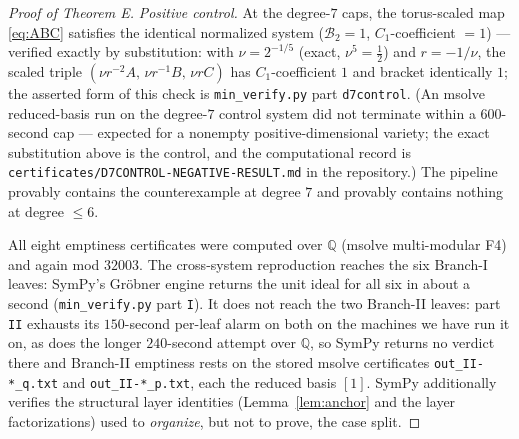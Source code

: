 \documentclass[11pt]{amsart}
\newcommand{\QQ}{\mathbb{Q}}
\newcommand{\brk}{\mathcal{B}}
\theoremstyle{plain}
\theoremstyle{definition}
\theoremstyle{remark}
\begin{document}
\begin{proof}[Proof of Theorem E]
\emph{Positive control.} At the degree-$7$ caps, the torus-scaled map
\eqref{eq:ABC} satisfies the identical normalized system ($\brk_{2}=1$,
$C_{1}$-coefficient $=1$) --- verified exactly by substitution: with
$\nu=2^{-1/5}$ (exact, $\nu^{5}=\tfrac12$) and $r=-1/\nu$, the scaled
triple $(\nu r^{-2}A,\,\nu r^{-1}B,\,\nu rC)$ has $C_{1}$-coefficient
$1$ and bracket identically $1$; the asserted form of this check is
\texttt{min\_verify.py} part \texttt{d7control}. (An msolve reduced-basis
run on the degree-$7$ control system did not terminate within a
$600$-second cap --- expected for a nonempty positive-dimensional
variety; the exact substitution above is the control, and the
computational record is
\texttt{certificates/D7CONTROL-NEGATIVE-RESULT.md} in the repository.)
The pipeline provably contains the counterexample at degree $7$ and
provably contains nothing at degree $\le6$.

All eight emptiness certificates were computed over $\QQ$ (msolve
multi-modular F4) and again mod $32003$. The cross-system reproduction
reaches the six Branch-I leaves: SymPy's Gr\"obner engine returns the
unit ideal for all six in about a second (\texttt{min\_verify.py}
part \texttt{I}). It does not reach the two Branch-II leaves: part
\texttt{II} exhausts its $150$-second per-leaf alarm on both on the machines
we have run it on, as does
the longer $240$-second attempt over $\QQ$, so SymPy returns no verdict
there and Branch-II emptiness rests on the stored msolve certificates
\texttt{out\_II-*\_q.txt} and \texttt{out\_II-*\_p.txt}, each the
reduced basis $[1]$. SymPy additionally verifies the structural layer
identities (Lemma~\ref{lem:anchor} and the layer factorizations) used to
\emph{organize}, but not to prove, the case split.
\end{proof}
\end{document}
